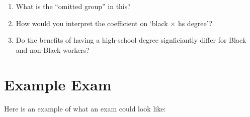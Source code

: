 \documentclass[12pt]{article}
\begin{document}
\begin{enumerate}
  \begin{enumerate}
    \item What is the ``omitted group'' in this?

    \item How would you interpret the coefficient on `black $\times$ hs degree'? 
    
    \item Do the benefits of having a high-school degree signficiantly differ for Black and non-Black workers?
  \end{enumerate}
\end{enumerate}







\newpage
\section*{Example Exam}

Here is an example of what an exam could look like: 
\end{document}
